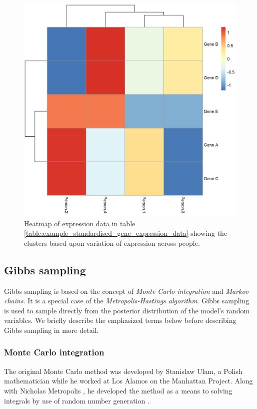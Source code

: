 \documentclass[12pt]{article} %
\begin{document}
\begin{figure}[!htb]
	\centering
	\includegraphics[scale=0.55]{Images/Examples/example_standardised_expression_data.png}
	\caption{Heatmap of expression data in table \ref{table:example_standardised_gene_expression_data} showing the clusters based upon variation of expression across people.}
	\label{fig:example_standardised_expression_data}
\end{figure}

\subsection{Gibbs sampling} \label{sec:additional_theory:sub_sec:gibbs_sampler}
Gibbs sampling is based on the concept of \emph{Monte Carlo integration} and \emph{Markov chains}. It is a special case of the \emph{Metropolis-Hastings algorithm}. Gibbs sampling is used to sample directly from the posterior distribution of the model's random variables. We briefly describe the emphasized terms below before describing Gibbs sampling in more detail.

\subsubsection{Monte Carlo integration}
The original Monte Carlo method was developed by Stanislaw Ulam, a Polish mathematician while he worked at Los Alamos on the Manhattan Project. Along with Nicholas Metropolis \cite{CooperCardinalsChaosReflection1989}, he developed the method as a means to solving integrals by use of random number generation \cite{MetropolisMonteCarloMethod1949}.
\end{document}
